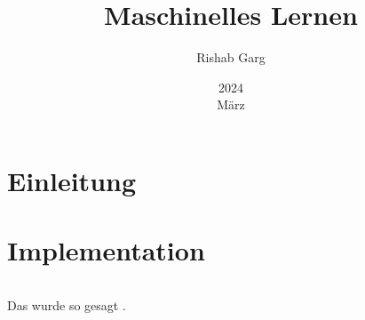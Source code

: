 \documentclass[10pt,titlepage]{article}
\title{Maschinelles Lernen}
\author{Rishab Garg}
\date{2024 \\ März}
\begin{document}
\maketitle

\begin{abstract}
  \blindtext
\end{abstract}

\tableofcontents

\section{Einleitung}

\blindmathpaper

\section{Implementation}

\inputminted[bgcolor=bg]{c}{../src/ml.c}

Das wurde so gesagt \autocite{nielsen_neural_2015}.

\printbibliography[heading=bibintoc]
\end{document}
